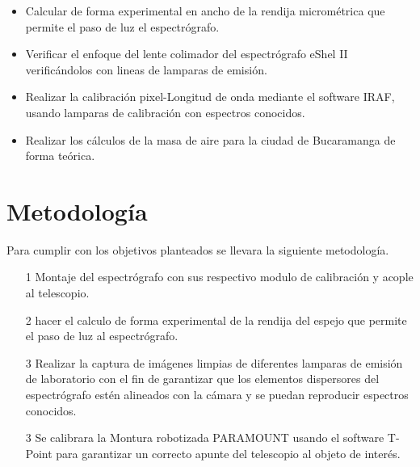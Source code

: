 \documentclass[11pt]{article}
\begin{document}
\begin{itemize}

\item Calcular de forma experimental en ancho de la rendija micrométrica que permite el paso de luz el espectrógrafo.

\item Verificar el enfoque del lente colimador del espectrógrafo eShel II verificándolos con lineas de lamparas de emisión.

\item Realizar la calibración pixel-Longitud de onda mediante el software IRAF, usando lamparas de calibración con espectros conocidos.

\item Realizar los cálculos de la masa de aire para la ciudad de Bucaramanga de forma teórica.

\end{itemize}




\newpage

\section{Metodolog\'ia}

Para cumplir con los objetivos planteados se llevara la siguiente metodología.

\begin{itemize}

\item[1] Montaje del espectrógrafo con sus respectivo modulo de calibración y acople al telescopio.

\item[2] hacer el calculo de forma experimental de la rendija del espejo que permite el paso de luz al espectrógrafo.

\item[3] Realizar la captura de imágenes limpias de diferentes lamparas de emisión de laboratorio con el fin de garantizar que los elementos dispersores del espectrógrafo estén alineados con la cámara y se puedan reproducir espectros conocidos.

\item[3] Se calibrara la Montura robotizada PARAMOUNT  usando el software T-Point para garantizar un correcto apunte del telescopio al objeto de interés.



 
\end{itemize}
\end{document}
